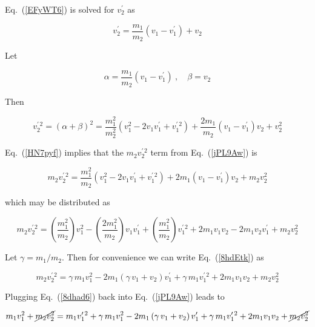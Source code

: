 \documentclass[main.tex]{subfiles}
\begin{document}
Eq.~(\ref{EFyWT6}) is solved for $v_2^{\prime}$ as

\begin{equation} \label{7OTaEl}
    v_2^{\prime} = \frac{m_1}{m_2} \left(v_1 - v_1^{\prime}\right) + v_2
\end{equation}

Let 

\begin{equation*}
    \alpha = \frac{m_1}{m_2} \left(v_1 - v_1^{\prime}\right)\ , \quad 
    \beta = v_2
\end{equation*}

Then

\begin{equation} \label{HN7pyf}
    v_2^{\prime\,2} = (\alpha + \beta)^2 = \frac{m_1^2}{m_2^2} \left(v_1^2 - 2v_1 v_1^{\prime} + v_1^{\prime\,2}\right) +
    \frac{2 m_1}{m_2} \left(v_1 - v_1^{\prime}\right) v_2 + v_2^2
\end{equation}



Eq.~(\ref{HN7pyf}) implies that the $m_2 v_2^{\prime\,2}$ term from Eq.~(\ref{jPL9Aw}) is

\begin{equation*}
    m_2 v_2^{\prime\,2} = \frac{m_1^2}{m_2} \left(v_1^2 - 2v_1 v_1^{\prime} + v_1^{\prime\,2}\right) +
    2m_1 \left(v_1 - v_1^{\prime}\right) v_2 + m_2 v_2^2
\end{equation*}

which may be distributed as

\begin{equation} \label{8hdEtk}
    m_2 v_2^{\prime\,2} = \left(\frac{m_1^2}{m_2}\right) v_1^2 - \left(\frac{2m_1^2}{m_2}\right) v_1 v_1^{\prime} + \left(\frac{m_1^2}{m_2}\right) v_1^{\prime\,2} + 2m_1 v_1 v_2 - 2 m_1 v_2 v_1^{\prime} + m_2 v_2^2
\end{equation}

Let $\gamma = m_1/m_2$. Then for convenience we can write Eq.~(\ref{8hdEtk}) as

\begin{equation} \label{8dhad6}
    m_2 v_2^{\prime\,2} = \gamma\, m_1 v_1^2 - 2 m_1 \left(\gamma\, v_1 + v_2\right)v_1^{\prime} + \gamma\, m_1 v_1^{\prime\,2} + 2m_1 v_1 v_2 + m_2 v_2^2
\end{equation}

Plugging Eq.~(\ref{8dhad6}) back into Eq.~(\ref{jPL9Aw}) leads to 

\begin{equation*}
    m_1 v_1^2 + \cancel{m_2 v_2^2} = m_1 v_1^{\prime\,2} + \gamma\, m_1 v_1^2 - 2 m_1 \left(\gamma\, v_1 + v_2\right)v_1^{\prime} + \gamma\, m_1 v_1^{\prime\,2} + 2m_1 v_1 v_2 + \cancel{m_2 v_2^2}
\end{equation*}
\end{document}
